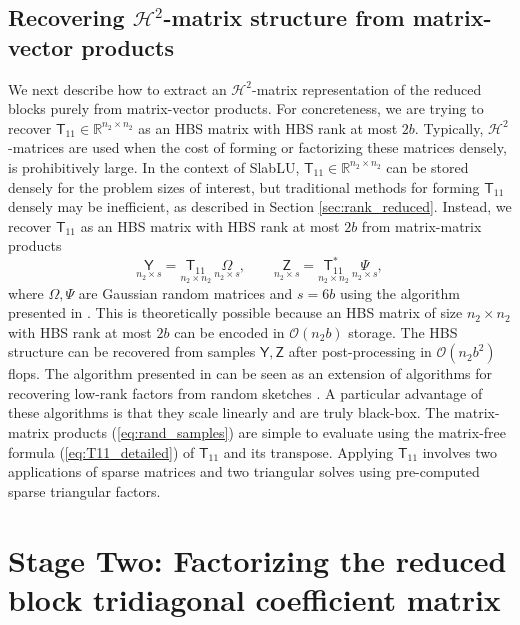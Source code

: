 \documentclass[11pt]{amsart}
\newcommand{\mtx}[1]{\bm{\mathsf{#1}}}
\begin{document}
\subsection{Recovering {$\mathcal{H}^2$}-matrix structure from matrix-vector products}
\label{sec:hmatrix_rand}
We next describe how to extract an $\mathcal H^2$-matrix representation 
of the reduced blocks purely from matrix-vector products.
For concreteness, we are trying to recover $\mtx T_{11} \in \mathbb{R}^{n_2 \times n_2}$ 
as an HBS matrix with HBS rank at most $2b$. Typically, $\mathcal H^2$-matrices are used 
when the cost of forming or factorizing these matrices densely, is prohibitively large. 
In the context of SlabLU, $\mtx T_{11} \in \mathbb{R}^{n_2 \times n_2}$ can be stored densely for the problem sizes of interest, but 
traditional methods for forming $\mtx T_{11}$ densely may be inefficient, 
as described in Section \ref{sec:rank_reduced}. 
Instead, we recover $\mtx T_{11}$ as an HBS matrix with HBS rank at most $2b$ from matrix-matrix products 
\begin{equation}\underset{n_2 \times s}{\mtx Y} = 
\underset{n_2 \times n_2}{\mtx T_{11}}\ \underset{n_2 \times s}{\mtx \Omega}, 
\qquad \underset{n_2 \times s}{\mtx Z} = \underset{n_2 \times n_2}{\mtx T_{11}^*}\ 
\underset{n_2 \times s}{\mtx \Psi},
\label{eq:rand_samples}
\end{equation} 
where $\mtx \Omega, \mtx \Psi$ are Gaussian random matrices and $s = 6b$ using the 
algorithm presented in \cite{levitt2022linear}. This is theoretically possible 
because an HBS matrix of size $n_2 \times n_2$ with HBS rank at most $2b$ can be encoded in $\mathcal O(n_2 b)$ storage.
The HBS structure can be recovered from samples $\mtx Y, \mtx Z$ after 
post-processing in $\mathcal O(n_2 b^2)$ flops. 
The algorithm presented in \cite{levitt2022linear} can be seen as an extension of algorithms for 
recovering low-rank factors from random sketches \cite{martinsson2020randomized}. 
A particular advantage of these algorithms is that they scale linearly and are truly black-box.
The matrix-matrix products (\ref{eq:rand_samples}) are simple to evaluate using the matrix-free 
formula (\ref{eq:T11_detailed}) of $\mtx T_{11}$ and its transpose. 
Applying $\mtx T_{11}$ involves
two applications of sparse matrices and two triangular solves using pre-computed
sparse triangular factors.

\section{Stage Two: Factorizing the reduced block tridiagonal coefficient matrix}
\label{sec:stagetwo}
\end{document}
